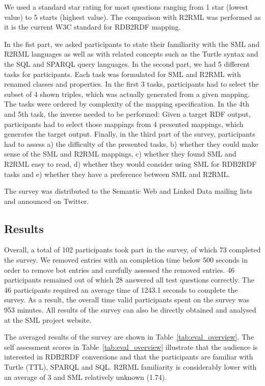 We used a standard star rating for most questions ranging from 1 star (lowest value) to 5 starts (highest value).
The comparison with R2RML was performed as it is the current W3C standard for RDB2RDF mapping.

In the fist part, we asked participants to state their familiarity with the SML and R2RML languages as well as with related concepts such as the Turtle syntax and the SQL and SPARQL query languages.
In the second part, we had 5 different tasks for participants.
Each task was formulated for SML and R2RML with renamed classes and properties.
In the first 3 tasks, participants had to select the subset of 4 shown triples, which was actually generated from a given mapping.
The tasks were ordered by complexity of the mapping specification.
In the 4th and 5th task, the inverse needed to be performed:
Given a target RDF output, participants had to select those mappings from 4 presented mappings, which generates the target output.
Finally, in the third part of the survey, participants had to assess a) the difficulty of the presented tasks, b) whether they could make sense of the SML and R2RML mappings, c) whether they found SML and R2RML easy to read, d) whether they would consider using SML for RDB2RDF tasks and e) whether they have a preference between SML and R2RML.

The survey was distributed to the Semantic Web and Linked Data mailing lists and announced on Twitter.

\subsection{Results}




Overall, a total of 102 participants took part in the survey, of which 73 completed the survey.
We removed entries with an completion time below 500 seconds in order to remove bot entries and carefully assessed the removed entries.
46 participants remained out of which 28 answered all test questions correctly.
The 46 participants required an average time of 1243.1 seconds to complete the survey.
As a result, the overall time valid participants spent on the survey was 953 minutes.
All results of the survey can also be directly obtained and analysed at the SML project website.

The averaged results of the survey are shown in Table~\ref{tab:eval_overview}.
The self assessment scores in Table~\ref{tab:eval_overview} illustrate that the audience is interested in RDB2RDF conversions and that the participants are familiar with Turtle (TTL), SPARQL and SQL.
R2RML familiarity is considerably lower with an average of 3 and SML relatively unknown (1.74).

